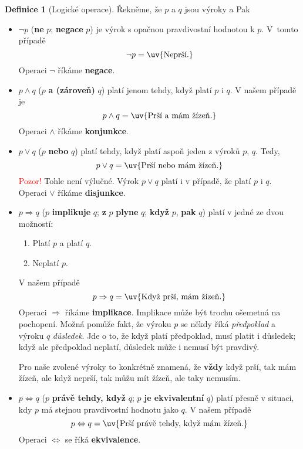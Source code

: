 \documentclass[a4paper,11pt]{article}
\theoremstyle{definition}
\newtheorem{dfn}[thm]{Definice}
\begin{document}
\begin{dfn}[Logické operace]
 Řekněme, že $p$ a $q$ jsou výroky  a  Pak
 \begin{itemize}
  \item $\neg p$ (\textbf{ne} $p$; \textbf{negace} $p$) je výrok s opačnou
   pravdivostní hodnotou k $p$. V~tom\-to případě
   \[
    \neg p = \text{\uv{Neprší.}}
   \]
   Operaci $\neg$ říkáme \textbf{negace}.
  \item $p \wedge q$ ($p$ \textbf{a (zároveň)} $q$) platí jenom tehdy, když
   platí $p$ i $q$. V našem případě je
   \[
    p \wedge q = \text{\uv{Prší a mám žízeň.}}
   \]
   Operaci $ \wedge $ říkáme \textbf{konjunkce}.
  \item $p \vee q$ ($p$ \textbf{nebo} $q$) platí tehdy, když platí aspoň jeden z
   výroků $p$, $q$. Tedy, \[
    p \vee q = \text{\uv{Prší nebo mám žízeň.}}
   \]
   \textcolor{red}{Pozor!} Tohle  není výlučné. Výrok $p \vee q$ platí
   i v případě, že platí $p$ i $q$. Operaci $ \vee $ říkáme \textbf{disjunkce}.
  \item $p \Rightarrow q$ ($p$ \textbf{implikuje} $q$; \textbf{z} $p$ 
   \textbf{plyne} $q$; \textbf{když} $p$, \textbf{pak} $q$) platí v jedné ze
   dvou možností:
   \begin{enumerate}[label=(\arabic*)]
    \item Platí $p$ a platí $q$.
    \item Neplatí $p$.
   \end{enumerate}
   V našem případě
   \[
    p \Rightarrow q = \text{\uv{Když prší, mám žízeň.}}
   \]
   Operaci $ \Rightarrow $ říkáme \textbf{implikace}. Implikace může být trochu
   ošemetná na pochopení. Možná pomůže fakt, že výroku $p$ se někdy říká 
   \emph{předpoklad} a výroku $q$ \emph{důsledek}. Jde o to, že když platí
   předpoklad, musí platit i důsledek; když ale předpoklad neplatí, důsledek
   může i nemusí být pravdivý.

   Pro naše zvolené výroky to konkrétně znamená, že \textbf{vždy} když prší, tak
   mám žízeň, ale když neprší, tak můžu mít žízeň, ale taky nemusím. \item $p
   \Leftrightarrow q$ ($p$ \textbf{právě tehdy, když} $q$; $p$ \textbf{je
   ekvivalentní} $q$) platí přesně v situaci, kdy $p$ má stejnou pravdivostní
   hodnotu jako $q$. V našem případě
   \[
    p \Leftrightarrow q = \text{\uv{Prší právě tehdy, když mám žízeň.}}
   \]
   Operaci $ \Leftrightarrow $ se říká \textbf{ekvivalence}.
 \end{itemize}
\end{dfn}
\end{document}
